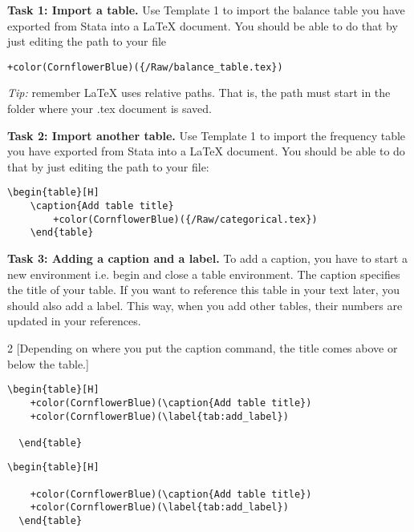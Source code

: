 \documentclass[12pts]{report}
\begin{document}
\textbf{Task 1: Import a table.} Use Template 1 to import the balance table you have exported from Stata into a {\LaTeX} document. You should be able to do that by just editing the path to your file
\begin{center}
\begin{Verbatim}[commandchars=+\(\)]
	+color(CornflowerBlue)({/Raw/balance_table.tex})
\end{Verbatim}
\end{center}

\begin{center}
	\textcolor{BurntOrange}{\emph{Tip:} remember {\LaTeX} uses relative paths. That is, the path must start in the folder where your .tex document is saved.}
\end{center}
		
\textbf{Task 2: Import another table.} Use Template 1 to import the frequency table you have exported from Stata into a {\LaTeX} document. You should be able to do that by just editing the path to your file:
\begin{center}
	\begin{Verbatim}[commandchars=+\(\)]
	\begin{table}[H]
	\caption{Add table title}
		+color(CornflowerBlue)({/Raw/categorical.tex})
	\end{table}
	\end{Verbatim}
\end{center}

\textbf{Task 3: Adding a caption and a label.} To add a caption, you have to start a new environment i.e. begin and close a table environment. The caption specifies the title of your table. If you want to reference this table in your text later, you should also add a label. This way, when you add other tables, their numbers are updated in your references. \\

\begin{multicols}{2}
	[Depending on where you put the caption command, the title comes above or below the table.]
	\begin{Verbatim}[commandchars=+\(\)]
  \begin{table}[H]
  	+color(CornflowerBlue)(\caption{Add table title})
  	+color(CornflowerBlue)(\label{tab:add_label})
  	
  \end{table}
	\end{Verbatim}

	\begin{Verbatim}[commandchars=+\(\)]
  \begin{table}[H]
  	
  	+color(CornflowerBlue)(\caption{Add table title})
  	+color(CornflowerBlue)(\label{tab:add_label})
  \end{table}
	\end{Verbatim}
\end{multicols}
\end{document}
